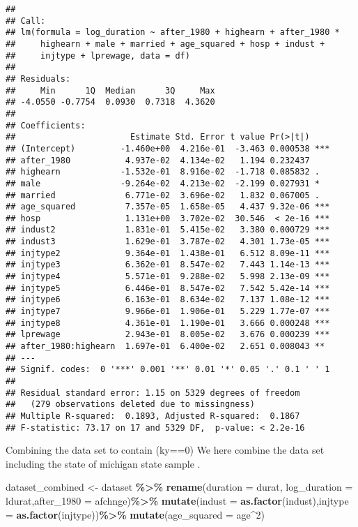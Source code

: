 \documentclass[
]{article}
\newenvironment{Shaded}{\begin{snugshade}}{\end{snugshade}}
\newcommand{\AttributeTok}[1]{\textcolor[rgb]{0.13,0.29,0.53}{#1}}
\newcommand{\DecValTok}[1]{\textcolor[rgb]{0.00,0.00,0.81}{#1}}
\newcommand{\FunctionTok}[1]{\textcolor[rgb]{0.13,0.29,0.53}{\textbf{#1}}}
\newcommand{\NormalTok}[1]{#1}
\newcommand{\OtherTok}[1]{\textcolor[rgb]{0.56,0.35,0.01}{#1}}
\newcommand{\SpecialCharTok}[1]{\textcolor[rgb]{0.81,0.36,0.00}{\textbf{#1}}}
\begin{document}
\begin{verbatim}
## 
## Call:
## lm(formula = log_duration ~ after_1980 + highearn + after_1980 * 
##     highearn + male + married + age_squared + hosp + indust + 
##     injtype + lprewage, data = df)
## 
## Residuals:
##     Min      1Q  Median      3Q     Max 
## -4.0550 -0.7754  0.0930  0.7318  4.3620 
## 
## Coefficients:
##                       Estimate Std. Error t value Pr(>|t|)    
## (Intercept)         -1.460e+00  4.216e-01  -3.463 0.000538 ***
## after_1980           4.937e-02  4.134e-02   1.194 0.232437    
## highearn            -1.532e-01  8.916e-02  -1.718 0.085832 .  
## male                -9.264e-02  4.213e-02  -2.199 0.027931 *  
## married              6.771e-02  3.696e-02   1.832 0.067005 .  
## age_squared          7.357e-05  1.658e-05   4.437 9.32e-06 ***
## hosp                 1.131e+00  3.702e-02  30.546  < 2e-16 ***
## indust2              1.831e-01  5.415e-02   3.380 0.000729 ***
## indust3              1.629e-01  3.787e-02   4.301 1.73e-05 ***
## injtype2             9.364e-01  1.438e-01   6.512 8.09e-11 ***
## injtype3             6.362e-01  8.547e-02   7.443 1.14e-13 ***
## injtype4             5.571e-01  9.288e-02   5.998 2.13e-09 ***
## injtype5             6.446e-01  8.547e-02   7.542 5.42e-14 ***
## injtype6             6.163e-01  8.634e-02   7.137 1.08e-12 ***
## injtype7             9.966e-01  1.906e-01   5.229 1.77e-07 ***
## injtype8             4.361e-01  1.190e-01   3.666 0.000248 ***
## lprewage             2.943e-01  8.005e-02   3.676 0.000239 ***
## after_1980:highearn  1.697e-01  6.400e-02   2.651 0.008043 ** 
## ---
## Signif. codes:  0 '***' 0.001 '**' 0.01 '*' 0.05 '.' 0.1 ' ' 1
## 
## Residual standard error: 1.15 on 5329 degrees of freedom
##   (279 observations deleted due to missingness)
## Multiple R-squared:  0.1893, Adjusted R-squared:  0.1867 
## F-statistic: 73.17 on 17 and 5329 DF,  p-value: < 2.2e-16
\end{verbatim}

Combining the data set to contain (ky==0) We here combine the data set
including the state of michigan state sample .

\begin{Shaded}
\begin{Highlighting}[]
\NormalTok{dataset\_combined }\OtherTok{\textless{}{-}}\NormalTok{ dataset }\SpecialCharTok{\%\textgreater{}\%} \FunctionTok{rename}\NormalTok{(}\AttributeTok{duration =}\NormalTok{ durat, }
\AttributeTok{log\_duration =}\NormalTok{ ldurat,}\AttributeTok{after\_1980 =}\NormalTok{ afchnge)}\SpecialCharTok{\%\textgreater{}\%} 
\FunctionTok{mutate}\NormalTok{(}\AttributeTok{indust =} \FunctionTok{as.factor}\NormalTok{(indust),}\AttributeTok{injtype =} \FunctionTok{as.factor}\NormalTok{(injtype))}\SpecialCharTok{\%\textgreater{}\%} 
\FunctionTok{mutate}\NormalTok{(}\AttributeTok{age\_squared =}\NormalTok{ age}\SpecialCharTok{\^{}}\DecValTok{2}\NormalTok{)}
\end{Highlighting}
\end{Shaded}
\end{document}
